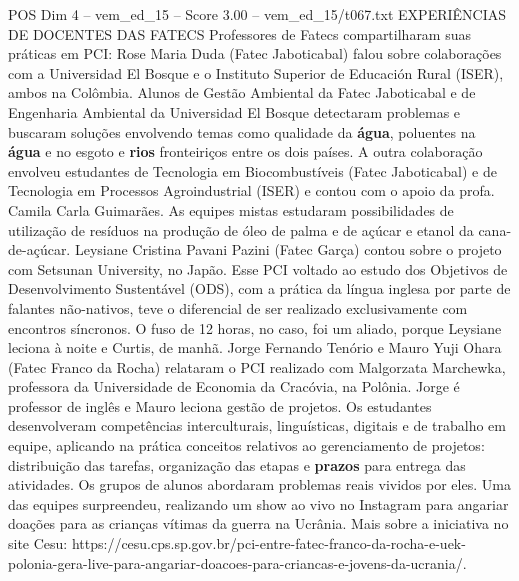 \begin{textsample}{POS Dim 4 – vem\_ed\_15 – Score 3.00 – vem\_ed\_15/t067.txt}  \label{ex:f4_pos_118}
EXPERIÊNCIAS DE DOCENTES DAS FATECS Professores de Fatecs compartilharam suas práticas em PCI: Rose Maria Duda (Fatec Jaboticabal) falou sobre colaborações com a Universidad El Bosque e o Instituto Superior de Educación Rural (ISER), ambos na Colômbia.
Alunos de Gestão Ambiental da Fatec Jaboticabal e de Engenharia Ambiental da Universidad El Bosque detectaram problemas e buscaram soluções envolvendo temas como qualidade da \textbf{água}, poluentes na \textbf{água} e no esgoto e \textbf{rios} fronteiriços entre os dois países.
A outra colaboração envolveu estudantes de Tecnologia em Biocombustíveis (Fatec Jaboticabal) e de Tecnologia em Processos Agroindustrial (ISER) e contou com o apoio da profa.
Camila Carla Guimarães.
As equipes mistas estudaram possibilidades de utilização de resíduos na produção de óleo de palma e de açúcar e etanol da cana-de-açúcar.
Leysiane Cristina Pavani Pazini (Fatec Garça) contou sobre o projeto com Setsunan University, no Japão.
Esse PCI voltado ao estudo dos Objetivos de Desenvolvimento Sustentável (ODS), com a prática da língua inglesa por parte de falantes não-nativos, teve o diferencial de ser realizado exclusivamente com encontros síncronos.
O fuso de 12 horas, no caso, foi um aliado, porque Leysiane leciona à noite e Curtis, de manhã.
Jorge Fernando Tenório e Mauro Yuji Ohara (Fatec Franco da Rocha) relataram o PCI realizado com Malgorzata Marchewka, professora da Universidade de Economia da Cracóvia, na Polônia.
Jorge é professor de inglês e Mauro leciona gestão de projetos.
Os estudantes desenvolveram competências interculturais, linguísticas, digitais e de trabalho em equipe, aplicando na prática conceitos relativos ao gerenciamento de projetos: distribuição das tarefas, organização das etapas e \textbf{prazos} para entrega das atividades.
Os grupos de alunos abordaram problemas reais vividos por eles.
Uma das equipes surpreendeu, realizando um show ao vivo no Instagram para angariar doações para as crianças vítimas da guerra na Ucrânia.
Mais sobre a iniciativa no site Cesu: https://cesu.cps.sp.gov.br/pci-entre-fatec-franco-da-rocha-e-uek-polonia-gera-live-para-angariar-doacoes-para-criancas-e-jovens-da-ucrania/.

\end{textsample}
